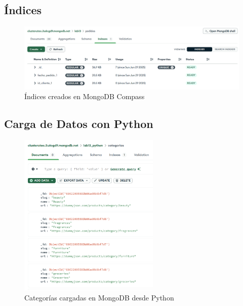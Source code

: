 \subsection{Índices}
\begin{figure}[H]
    \centering
    \includegraphics[width=1\textwidth]{./p1_indices.png}
    \caption{Índices creados en MongoDB Compass}\label{fig:indices}
\end{figure}

\subsection{Carga de Datos con Python}\label{cargadatos}

\begin{figure}[H]
    \centering
    \includegraphics[width=0.6\textwidth]{./p2_categorias.png}
    \caption{Categorías cargadas en MongoDB desde Python}\label{fig:pythoncategorias}
\end{figure}


